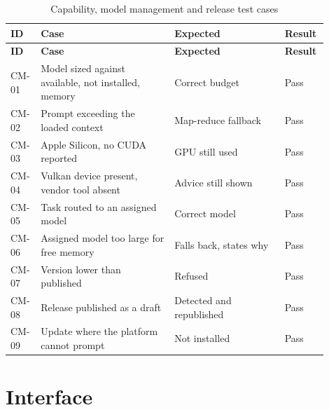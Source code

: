 \documentclass[12pt,a4paper]{report}
\begin{document}
\begin{longtable}{@{}p{0.07\linewidth}p{0.40\linewidth}p{0.33\linewidth}p{0.10\linewidth}@{}}
\caption{Capability, model management and release test cases}\label{tab:cm}\\
\toprule
\textbf{ID} & \textbf{Case} & \textbf{Expected} & \textbf{Result} \\
\midrule
\endfirsthead
\toprule
\textbf{ID} & \textbf{Case} & \textbf{Expected} & \textbf{Result} \\
\midrule
\endhead

CM-01 & Model sized against available, not installed, memory & Correct budget
  & Pass \\
CM-02 & Prompt exceeding the loaded context & Map-reduce fallback & Pass \\
CM-03 & Apple Silicon, no CUDA reported & GPU still used & Pass \\
CM-04 & Vulkan device present, vendor tool absent & Advice still shown
  & Pass \\
CM-05 & Task routed to an assigned model & Correct model & Pass \\
CM-06 & Assigned model too large for free memory & Falls back, states why
  & Pass \\
CM-07 & Version lower than published & Refused & Pass \\
CM-08 & Release published as a draft & Detected and republished & Pass \\
CM-09 & Update where the platform cannot prompt & Not installed & Pass \\
\bottomrule
\end{longtable}

\section{Interface}
\end{document}
